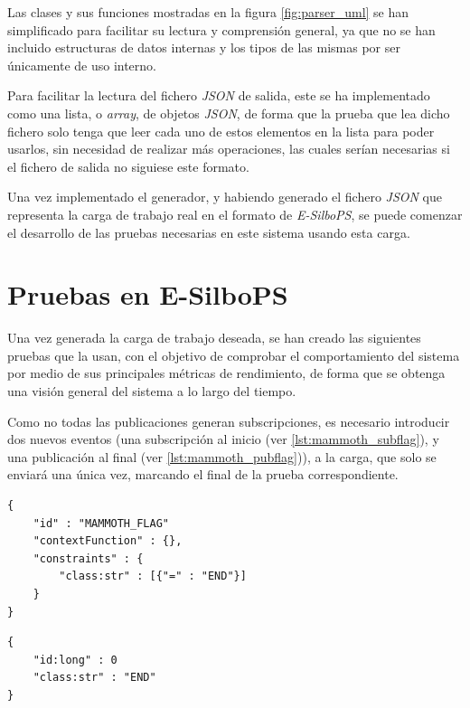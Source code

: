 Las clases y sus funciones mostradas en la figura \autoref{fig:parser_uml} se han simplificado para 
facilitar su lectura y comprensión general, ya que no se han incluido estructuras de datos internas
y los tipos de las mismas por ser únicamente de uso interno.

Para facilitar la lectura del fichero \textit{JSON} de salida, este se ha implementado como una lista,
o \textit{array}, de objetos \textit{JSON}, de forma que la prueba que lea dicho fichero solo tenga
que leer cada uno de estos elementos en la lista para poder usarlos, sin necesidad de realizar más
operaciones, las cuales serían necesarias si el fichero de salida no siguiese este formato.

Una vez implementado el generador, y habiendo generado el fichero \textit{JSON} que representa la carga
de trabajo real en el formato de \textit{E-SilboPS}, se puede comenzar el desarrollo de las pruebas
necesarias en este sistema usando esta carga.


\section{Pruebas en E-SilboPS} \label{sct:desarrollo_pruebas-esilbops}

Una vez generada la carga de trabajo deseada, se han creado las siguientes pruebas que la usan, con 
el objetivo de comprobar el comportamiento del sistema por medio de sus principales métricas de 
rendimiento, de forma que se obtenga una visión general del sistema a lo largo del tiempo.

Como no todas las publicaciones generan subscripciones, es necesario introducir dos nuevos eventos
(una subscripción al inicio (ver \autoref{lst:mammoth_subflag}), y una publicación al final 
(ver \autoref{lst:mammoth_pubflag})), a la carga, que solo se enviará una única vez, marcando el
final de la prueba correspondiente.

\begin{minipage}[t]{.5\textwidth}
\begin{lstlisting}[caption={Subscripción en E-SilboPS para identificar el final de la carga.}, label={lst:mammoth_subflag}, style=consola,captionpos=b]
{
	"id" : "MAMMOTH_FLAG"
	"contextFunction" : {},
	"constraints" : {
		"class:str" : [{"=" : "END"}]
	}
}
\end{lstlisting}
\end{minipage}
\hfill
\begin{minipage}[t]{.45\textwidth}
\begin{lstlisting}[caption={Publicación en E-SilboPS que marca el final de la carga.}, label={lst:mammoth_pubflag}, style=consola,captionpos=b]
{
    "id:long" : 0
    "class:str" : "END"
}
\end{lstlisting}
\end{minipage}

